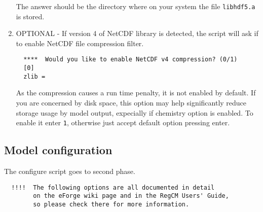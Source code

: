 \begin{enumerate}
The answer should be the directory where on your system the file
\verb=libhdf5.a= is stored.
\item OPTIONAL - If version 4 of NetCDF library is detected, the script
will ask if to enable NetCDF file compression filter.
\begin{Verbatim}
  ****  Would you like to enable NetCDF v4 compression? (0/1)
  [0]
  zlib =
\end{Verbatim}
As the compression causes a run time penalty, it is not enabled by
default. If you are concerned by disk space, this option may help
significantly reduce storage usage by model output, expecially if
chemistry option is enabled. To enable it enter \verb=1=, otherwise
just accept default option pressing enter.
\end{enumerate}

\subsection{Model configuration}
\label{modconf}

The configure script goes to second phase.

\begin{Verbatim}
  !!!!  The following options are all documented in detail 
        on the eForge wiki page and in the RegCM Users' Guide,
        so please check there for more information.
\end{Verbatim}

